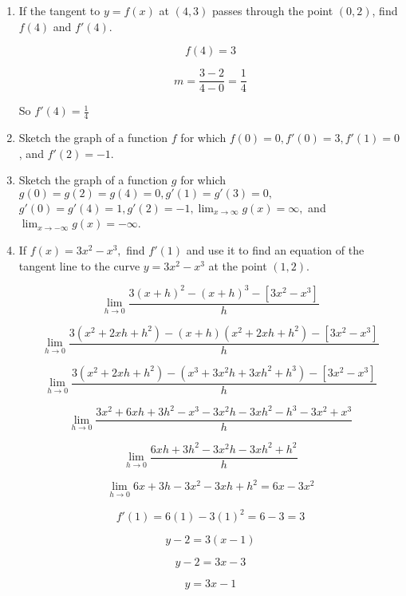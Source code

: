 \documentclass{article}
\begin{document}
\begin{enumerate}
		\item If the tangent to $y = f(x)$ at $(4,3)$ passes through the point $(0,2)$, find $f(4)$ and
			$f'(4)$.

			$$f(4) = 3$$

			$$m = \frac{3 - 2}{4 - 0} = \frac{1}{4}$$

			So $f'(4) = \frac{1}{4}$

		\item Sketch the graph of a function $f$ for which $f(0) = 0, f'(0) = 3, f'(1) = 0$, and
			$f'(2) = -1$.

		\item Sketch the graph of a function $g$ for which
			$g(0) = g(2) = g(4) = 0, g'(1) = g'(3) = 0,$
			$g'(0) = g'(4) = 1, g'(2) = -1, \lim _{x \to \infty} g(x) = \infty,$
			and $\lim _{x \to -\infty} g(x) = -\infty$.

		\item If $f(x) = 3x^2 - x^3,$ find $f'(1)$ and use it to find an equation of the tangent
			line to the curve $y = 3x^2 - x^3$ at the point $(1,2)$.

			$$\lim \limits _{h \to 0} \frac{3(x+h)^2 - (x+h)^3 - [3x^2-x^3]}{h}$$

			$$\lim \limits _{h \to 0} \frac{3(x^2+2xh+h^2)-(x+h)(x^2+2xh+h^2) - [3x^2-x^3]}{h}$$

			$$\lim \limits _{h \to 0} \frac{3(x^2+2xh+h^2)-(x^3+3x^2h+3xh^2+h^3) - [3x^2-x^3]}{h}$$

			$$\lim \limits _{h \to 0} \frac{3x^2+6xh+3h^2-x^3-3x^2h-3xh^2-h^3-3x^2+x^3}{h}$$

			$$\lim \limits _{h \to 0} \frac{6xh+3h^2-3x^2h-3xh^2+h^2}{h}$$

			$$\lim \limits _{h \to 0} 6x + 3h - 3x^2 - 3xh + h^2 = 6x - 3x^2$$

			$$f'(1) = 6(1)-3(1)^2 = 6-3 = 3$$

			$$y - 2 = 3(x - 1)$$

			$$y - 2 = 3x - 3$$

			$$y = 3x - 1$$
	\end{enumerate}
\end{document}
